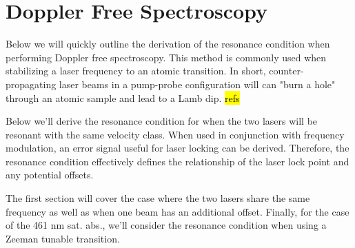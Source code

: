 \chapter{Doppler Free Spectroscopy} \label{app:dopSpec}
Below we will quickly outline the derivation of the resonance condition when performing Doppler free spectroscopy.
This method is commonly used when stabilizing a laser frequency to an atomic transition.
In short, counter-propagating laser beams in a pump-probe configuration will can "burn a hole" through an atomic sample and lead to a Lamb dip. \hl{refs}

Below we'll derive the resonance condition for when the two lasers will be resonant with the same velocity class.
When used in conjunction with frequency modulation, an error signal useful for laser locking can be derived.
Therefore, the resonance condition effectively defines the relationship of the laser lock point and any potential offsets.

The first section will cover the case where the two lasers share the same frequency as well as when one beam has an additional offset.
Finally, for the case of the 461 nm sat. abs., we'll consider the resonance condition when using a Zeeman tunable transition. 

